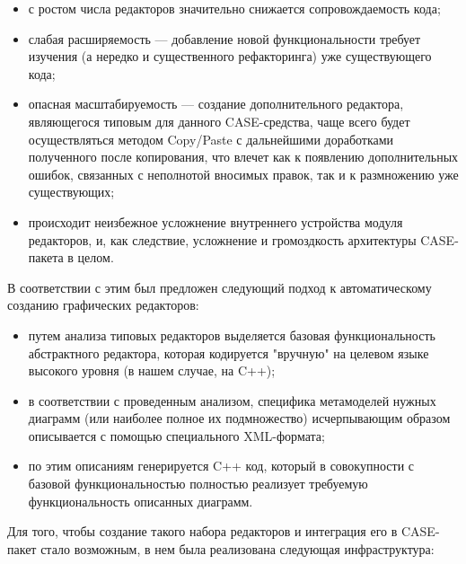 \documentclass[a5paper]{article}
\begin{document}
\begin{itemize}
  \item с ростом числа редакторов значительно снижается сопровождаемость кода;
  \item слабая расширяемость --- добавление новой функциональности требует
        изучения (а нередко и существенного рефакторинга) уже существующего
        кода;
  \item опасная масштабируемость --- создание дополнительного редактора,
        являющегося типовым для данного CASE-средства, чаще всего будет
        осуществляться методом Copy/Paste с
        дальнейшими доработками полученного после копирования, что влечет как к
        появлению дополнительных ошибок, связанных с неполнотой вносимых
        правок, так и к размножению уже существующих;
  \item происходит неизбежное усложнение внутреннего устройства модуля
        редакторов, и, как следствие, усложнение и громоздкость архитектуры
        CASE-пакета в целом.
\end{itemize}

В соответствии с этим был предложен следующий подход к автоматическому
созданию графических редакторов:

\begin{itemize}
  \item путем анализа типовых редакторов выделяется базовая функциональность
        абстрактного редактора, которая кодируется "вручную" на целевом языке
        высокого уровня (в нашем случае, на C++);
  \item в соответствии с проведенным анализом, специфика метамоделей нужных
        диаграмм (или наиболее полное их подмножество) исчерпывающим образом
        описывается с помощью специального XML-формата;
  \item по этим описаниям генерируется C++ код,
        который в совокупности с базовой функциональностью полностью реализует
        требуемую функциональность описанных диаграмм.
\end{itemize}

Для того, чтобы создание такого набора редакторов и интеграция его в
CASE-пакет стало возможным, в нем была реализована следующая инфраструктура:
\end{document}
